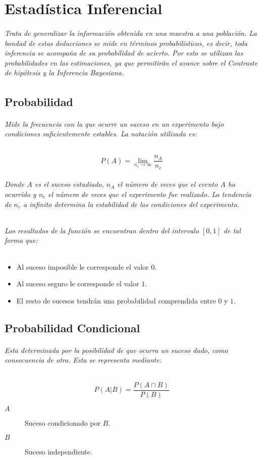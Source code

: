 \chapter{Estadística Inferencial}
\subparagraph{
Trata de generalizar la información obtenida en una muestra a una población. La bondad de estas deducciones se mide en términos probabilísticos, es decir, toda inferencia se acompaña de su probabilidad de acierto.
Por esto se utilizan las probabilidades en las estimaciones, ya que permitirán el avance sobre el Contraste de hipótesis y la Inferencia Bayesiana\cite{LECHUGA}.
}



\section{Probabilidad}
\subparagraph{
Mide la frecuencia con la que ocurre un suceso en un experimento bajo condiciones suficientemente estables\cite{WIKIPROBABILIDAD}. La notación utilizada es:
}
\begin{equation}
P(A)=\lim_{n_{c}\to\infty}\frac{n_{A}}{n_{c}}
\end{equation}
\subparagraph{
Donde $A$ es el suceso estudiado, $n_{A}$ el número de veces que el evento $A$ ha ocurrido y $n_{c}$ el número de veces que el experimento fue realizado. La tendencia de $n_{c}$ a infinito determina la estabilidad de las condiciones del experimento.
}
\subparagraph{
Los resultados de la función se encuentran dentro del intervalo $[0,1]$ de tal forma que:
}
\begin{itemize}
\item Al suceso imposible le corresponde el valor $0$.
\item Al suceso seguro le corresponde el valor $1$.
\item El resto de sucesos tendrán una probabilidad comprendida entre $0$ y $1$.
\end{itemize}


\section{Probabilidad Condicional}
\subparagraph{
Esta determinada por la posibilidad de que ocurra un suceso dado, como consecuencia de otro. Esta se representa mediante:
}
\begin{equation}
P(A|B)=\frac{P(A \cap B)}{P(B)}
\end{equation}
\begin{description}
\item[$A$] Suceso condicionado por $B$.
\item[$B$] Suceso independiente.
\end{description}
